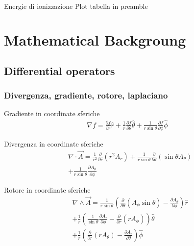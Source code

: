 \documentclass[oneside,12pt,fleqn]{memoir}
\begin{document}
\begin{todo}{Energie di ionizzazione}
Plot tabella in preamble
\end{todo}

\part{Mathematical Backgroung}

\chapter{Differential operators}
\PartialToc

\section{Divergenza, gradiente, rotore, laplaciano}

\begin{usefull}{Gradiente in coordinate sferiche}
\begin{align*}
\nabla f=\frac{\partial f}{\partial r}\hat{r}+\frac{1}{r}\frac{\partial f}{\partial \theta}\hat{\theta}+\frac{1}{r\sin{\theta}}\frac{\partial f}{\partial \phi}\hat{\phi}    
\end{align*}
\end{usefull}

\begin{usefull}{Divergenza in coordinate sferiche}
\begin{align*}
&\nabla\cdot\vec{A}=\frac{1}{r^2}\frac{\partial}{\partial r}(r^2A_r)+\frac{1}{r\sin{\theta}}\frac{\partial }{\partial \theta}(\sin{\theta}A_{\theta})\\
&+\frac{1}{r\sin{\theta}}\frac{\partial A_{\phi}}{\partial \phi}
\end{align*}
\end{usefull}

\begin{usefull}{Rotore in coordinate sferiche}
\begin{align*}
&\nabla\wedge\vec{A}=\frac{1}{r\sin{\theta}}(\frac{\partial}{\partial \theta}(A_{\phi}\sin{\theta})-\frac{\partial A_{\theta}}{\partial \phi})\hat{r}\\
&+\frac{1}{r}(\frac{1}{\sin{\theta}}\frac{\partial A_r}{\partial \phi}-\frac{\partial}{\partial r}(rA_{\phi}))\hat{\theta}\\
&+\frac{1}{r}(\frac{\partial}{\partial r}(rA_{\theta})-\frac{\partial A_r}{\partial \theta})\hat{\phi}
\end{align*}
\end{usefull}
\end{document}
